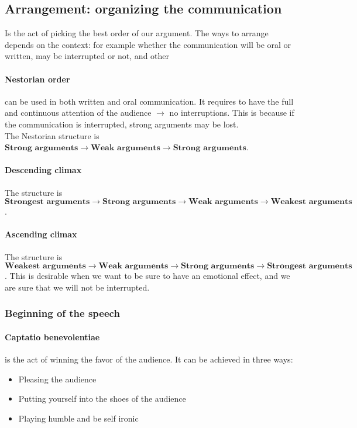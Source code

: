 \documentclass{article}
\begin{document}
\subsection{Arrangement: organizing the communication} Is the act of picking the best order of our argument. The ways to arrange depends on the context: for example whether the communication will be oral or written, may be interrupted or not, and other
\paragraph{Nestorian order} can be used in both written and oral communication. It requires to have the full and continuous attention of the audience $\rightarrow$ no interruptions. This is because if the communication is interrupted, strong arguments may be lost.\\
The Nestorian structure is $\textbf{Strong arguments}\rightarrow\textbf{Weak arguments}\rightarrow\textbf{Strong arguments}$.
\paragraph{Descending climax} The structure is $\textbf{Strongest arguments}\rightarrow\textbf{Strong arguments}\rightarrow\textbf{Weak arguments}\rightarrow\textbf{Weakest arguments}$.
\paragraph{Ascending climax} The structure is $\textbf{Weakest arguments}\rightarrow\textbf{Weak arguments}\rightarrow\textbf{Strong arguments}\rightarrow\textbf{Strongest arguments}$. This is desirable when we want to be sure to have an emotional effect, and we are sure that we will not be interrupted.

\subsubsection{Beginning of the speech}
\paragraph{Captatio benevolentiae} is the act of winning the favor of the audience. It can be achieved in three ways:
\begin{itemize}
\item Pleasing the audience
\item Putting yourself into the shoes of the audience
\item Playing humble and be self ironic
\end{itemize}
\end{document}
